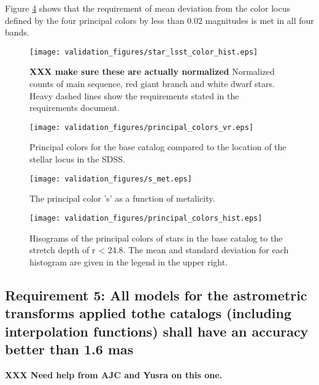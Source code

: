 \documentclass[]{article}
\begin{document}
Figure \ref{fig:principalcolorshist} shows that the requirement of mean deviation from the color locus defined by the four principal colors by less than 
0.02 magnitudes is met in all four bands.
\begin{figure}
\centering
\texttt{[image: validation\_figures/star\_lsst\_color\_hist.eps]}
\caption{{\bf XXX make sure these are actually normalized} Normalized counts of main sequence, red giant branch and white dwarf stars.  Heavy dashed lines show the requirements stated in the requirements document.\label{fig:starcolorspan}}
\end{figure}

\begin{figure}
\centering
\texttt{[image: validation\_figures/principal\_colors\_vr.eps]}
\caption{Principal colors for the base catalog compared to the location of the stellar locus in the SDSS.\label{fig:principalcolors}}
\end{figure}

\begin{figure}
\centering
\texttt{[image: validation\_figures/s\_met.eps]}
\caption{The principal color 's' as a function of metalicity.\label{fig:sfeh}}
\end{figure}

\begin{figure}
\centering
\texttt{[image: validation\_figures/principal\_colors\_hist.eps]}
\caption{Hisograms of the principal colors of stars in the base catalog to the stretch depth of r < 24.8. The mean and standard deviation for each 
histogram are given in the legend in the upper right.\label{fig:principalcolorshist}}
\end{figure}
\subsection{Requirement 5: All models for the astrometric transforms applied tothe catalogs (including interpolation functions) 
shall have an accuracy better than 1.6 mas}
{\bf XXX Need help from AJC and Yusra on this one.}
\end{document}
